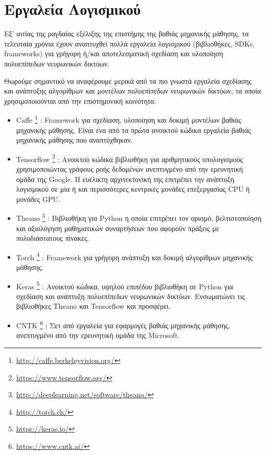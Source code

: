\section{Εργαλεία Λογισμικού}
\label{sec:dnn_sw}

Εξ' αιτίας της ραγδαίας εξέλιξης της επιστήμης της βαθιάς μηχανικής μάθησης,
τα τελευταία χρόνια έχουν αναπτυχθεί πολλά εργαλεία λογισμικού (βιβλιοθήκες, SDKs, frameworks)
για γρήγορη ή/και αποτελεσματική σχεδίαση και υλοποίηση πολυεπίπεδων νευρωνικών δικτύων.

Θωρούμε σημαντικό να αναφέρουμε μερικά από τα πιο γνωστά εργαλεία
σχεδίασης και ανάπτυξης αλγορίθμων και μοντέλων πολυεπίπεδων νευρωνικών δικτύων, τα οποία
χρησιμοποιούνται από την επιστημονική κοινότητα:
\begin{itemize}
  \item{Caffe \footnote{\href{http://caffe.berkeleyvision.org/}{http://caffe.berkeleyvision.org/}} %
      \cite{jia2014caffe}:
    Framework για σχεδίαση, υλοποίηση και δοκιμή μοντέλων βαθιάς μηχανικής μάθησης.
    Είναι ένα από τα πρώτα ανοικτού κώδικα εργαλεία βαθιάς μηχανικής μάθησης που αναπτύχθηκαν.}
  \item{Tensorflow \footnote{\href{https://www.tensorflow.org/}{https://www.tensorflow.org/}} %
      \cite{DBLP:journals/corr/AbadiBCCDDDGIIK16}:
    Ανοικτού κώδικα βιβλιοθήκη για αριθμητικούς υπολογισμούς χρησιμοποιώντας
    γράφους ροής δεδομένων ανεπτυγμένο από την ερευνητική ομάδα της Google.
    Η ευέλικτη αρχιτεκτονική της επιτρέπει την ανάπτυξη
    λογισμικού σε μία ή και περισσότερες κεντρικές μονάδες επεξεργασίας CPU ή μονάδες GPU.}
  \item{Theano \footnote{\href{http://deeplearning.net/software/theano/}{http://deeplearning.net/software/theano/}}
      \cite{2016arXiv160502688full}\cite{bergstra+al:2010-scipy}\cite{Bastien-Theano-2012}: %
      Βιβλιοθήκη για Python η οποία επιτρέπει τον ορισμό, βελτιστοποίηση και αξιολόγηση
      μαθηματικών συναρτήσεων που αφορούν πράξεις με πολυδιάστατους πίνακες.}
    \item{Torch \footnote{\href{http://torch.ch/}{http://torch.ch/}} %
        \cite{collobert2002torch}\cite{collobert2011torch7}\cite{collobert2012implementing}:
      Framework για γρήγορη ανάπτυξη και δοκιμή αλγορίθμων μηχανικής μάθησης.}
    \item{Keras \footnote{\href{https://keras.io/}{https://keras.io/}} \cite{chollet2015keras}:
    Ανοικτού κώδικα, υψηλού επιπέδου βιβλιοθήκη σε Python για σχεδίαση και ανάπτυξη
    πολυεπίπεδων νευρωνικών δικτύων. Ενσωματώνει
    τις βιβλιοθήκες Theano και Tensorflow και προσφέρει.} %
  \item{CNTK \footnote{\href{https://www.cntk.ai/}{https://www.cntk.ai/}} \cite{Seide:2016:CMO:2939672.2945397}:
    Σετ από εργαλεία για εφαρμογές βαθιάς μηχανικής μάθησης, ανεπτυγμένο από την ερευνητική ομάδα της Microsoft.}
\end{itemize}

